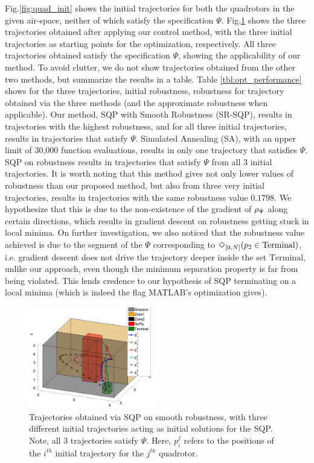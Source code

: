 Fig.\ref{fig:quad_init} shows the initial trajectories for both the quadrotors in the given air-space, neither of which satisfy the specification $\Psi$. Fig.\ref{fig:quad_ssqp} shows the three trajectories obtained after applying our control method, with the three initial trajectories as starting points for the optimization, respectively. All three trajectories obtained satisfy the specification $\Psi$, showing the applicability of our method. To avoid clutter, we do not show trajectories obtained from the other two methods, but summarize the results in a table. Table \ref{tbl:opt_performance} shows for the three trajectories, initial robustness, robustness for trajectory obtained via the three methods (and the approximate robustness when applicable). Our method, SQP with Smooth Robustness (SR-SQP), results in trajectories with the highest robustness, and for all three initial trajectories, results in trajectories that satisfy $\Psi$. Simulated Annealing (SA), with an upper limit of 30,000 function evaluations, results in only one trajectory that satisfies $\Psi$. SQP on robustness results in trajectories that satisfy $\Psi$ from all 3 initial trajectories. It is worth noting that this method gives not only lower values of robustness than our proposed method, but also from three very initial trajectories, results in trajectories with the same robustness value $0.1798$. We hypothesize that this is due to the non-existence of the gradient of $\rho_{\Psi}$ along certain directions, which results in gradient descent on robustness getting stuck in local minima. On further investigation, we also noticed that the robustness value achieved is due to the segment of the $\Psi$ corresponding to $\Diamond_{[0,N]}(p_2 \in \text{Terminal})$, i.e. gradient descent does not drive the trajectory deeper inside the set $\text{Terminal}$, unlike our approach, even though the minimum separation property is far from being violated. This lends credence to our hypothesis of SQP terminating on a local minima (which is indeed the flag MATLAB's optimization gives).


\begin{figure}[t]
\centering
\includegraphics[width=0.49\textwidth]{figures/QuadTrajs_scissored}
\caption{ Trajectories obtained via SQP on smooth robustness, with three different initial trajectories acting as initial solutions for the SQP. Note, all 3 trajectories satisfy $\Psi$. Here, $p_{i}^j$ refers to the positions of the $i^{th}$ initial trajectory for the $j^{th}$ quadrotor.}
\label{fig:quad_ssqp}
\end{figure}

